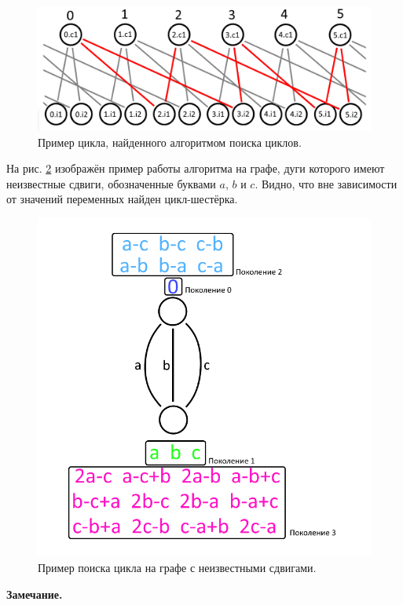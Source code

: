 \documentclass[14pt]{mmcs-article}
\begin{document}
\begin{figure}[H]
  \centering
  \includegraphics[scale=0.4]{Fig_4.png}
  \caption{ Пример цикла, найденного алгоритмом поиска циклов. }
  \label{image:4}
\end{figure}

На рис. \ref{image:5} изображён пример работы алгоритма на графе, дуги которого имеют неизвестные сдвиги, обозначенные буквами $a$, $b$ и $c$. Видно, что вне зависимости от значений переменных найден цикл-шестёрка.
 
\begin{figure}[H]
  \centering
  \includegraphics[scale=0.4]{Fig_5.png}
  \caption{ Пример поиска цикла на графе с неизвестными сдвигами. }
  \label{image:5}
\end{figure}

\textbf{Замечание.}
\end{document}
